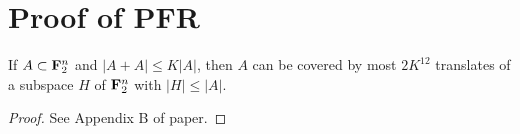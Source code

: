 \chapter{Proof of PFR}

\begin{theorem}[PFR]\label{pfr}  If $A \subset {\bf F}_2^n$ and $|A+A| \leq K|A|$, then $A$ can be covered by most $2K^{12}$ translates of a subspace $H$ of ${\bf F}_2^n$ with $|H| \leq |A|$.
\end{theorem}

\begin{proof}  See Appendix B of paper.
\end{proof}

